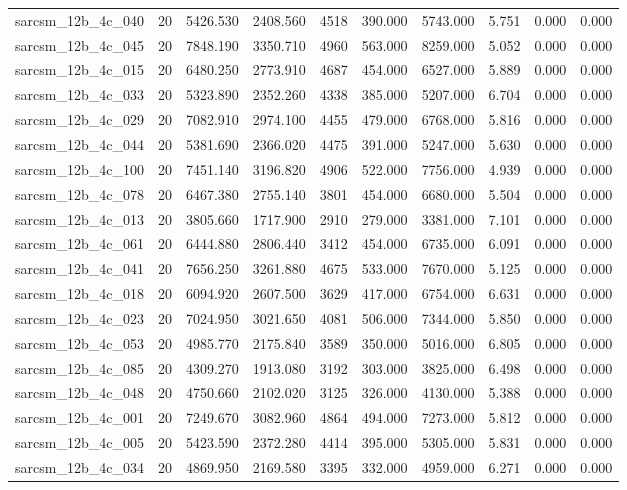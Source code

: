 \begin{tabular}{lrrrrrrrrr}
sarcsm\_12b\_4c\_040 & 20 & 5426.530 & 2408.560 & 4518 & 390.000 & 5743.000 & 5.751 & 0.000 & 0.000 \\
sarcsm\_12b\_4c\_045 & 20 & 7848.190 & 3350.710 & 4960 & 563.000 & 8259.000 & 5.052 & 0.000 & 0.000 \\
sarcsm\_12b\_4c\_015 & 20 & 6480.250 & 2773.910 & 4687 & 454.000 & 6527.000 & 5.889 & 0.000 & 0.000 \\
sarcsm\_12b\_4c\_033 & 20 & 5323.890 & 2352.260 & 4338 & 385.000 & 5207.000 & 6.704 & 0.000 & 0.000 \\
sarcsm\_12b\_4c\_029 & 20 & 7082.910 & 2974.100 & 4455 & 479.000 & 6768.000 & 5.816 & 0.000 & 0.000 \\
sarcsm\_12b\_4c\_044 & 20 & 5381.690 & 2366.020 & 4475 & 391.000 & 5247.000 & 5.630 & 0.000 & 0.000 \\
sarcsm\_12b\_4c\_100 & 20 & 7451.140 & 3196.820 & 4906 & 522.000 & 7756.000 & 4.939 & 0.000 & 0.000 \\
sarcsm\_12b\_4c\_078 & 20 & 6467.380 & 2755.140 & 3801 & 454.000 & 6680.000 & 5.504 & 0.000 & 0.000 \\
sarcsm\_12b\_4c\_013 & 20 & 3805.660 & 1717.900 & 2910 & 279.000 & 3381.000 & 7.101 & 0.000 & 0.000 \\
sarcsm\_12b\_4c\_061 & 20 & 6444.880 & 2806.440 & 3412 & 454.000 & 6735.000 & 6.091 & 0.000 & 0.000 \\
sarcsm\_12b\_4c\_041 & 20 & 7656.250 & 3261.880 & 4675 & 533.000 & 7670.000 & 5.125 & 0.000 & 0.000 \\
sarcsm\_12b\_4c\_018 & 20 & 6094.920 & 2607.500 & 3629 & 417.000 & 6754.000 & 6.631 & 0.000 & 0.000 \\
sarcsm\_12b\_4c\_023 & 20 & 7024.950 & 3021.650 & 4081 & 506.000 & 7344.000 & 5.850 & 0.000 & 0.000 \\
sarcsm\_12b\_4c\_053 & 20 & 4985.770 & 2175.840 & 3589 & 350.000 & 5016.000 & 6.805 & 0.000 & 0.000 \\
sarcsm\_12b\_4c\_085 & 20 & 4309.270 & 1913.080 & 3192 & 303.000 & 3825.000 & 6.498 & 0.000 & 0.000 \\
sarcsm\_12b\_4c\_048 & 20 & 4750.660 & 2102.020 & 3125 & 326.000 & 4130.000 & 5.388 & 0.000 & 0.000 \\
sarcsm\_12b\_4c\_001 & 20 & 7249.670 & 3082.960 & 4864 & 494.000 & 7273.000 & 5.812 & 0.000 & 0.000 \\
sarcsm\_12b\_4c\_005 & 20 & 5423.590 & 2372.280 & 4414 & 395.000 & 5305.000 & 5.831 & 0.000 & 0.000 \\
sarcsm\_12b\_4c\_034 & 20 & 4869.950 & 2169.580 & 3395 & 332.000 & 4959.000 & 6.271 & 0.000 & 0.000 \\

\end{tabular}
